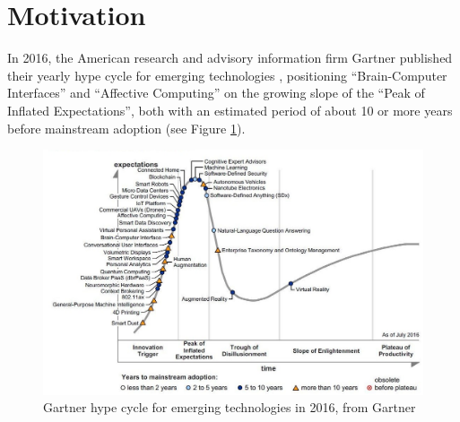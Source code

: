\section{Motivation}
\label{sec:motivation}
In 2016, the American research and advisory information firm Gartner published their yearly hype cycle for emerging 
technologies , positioning “Brain-Computer Interfaces” and “Affective Computing” on the growing slope of the “Peak of Inflated Expectations”, both with an estimated period of about 10 or more years before mainstream adoption (see Figure \ref{fig_hype_cycle}).
\begin{figure}[ht]
\includegraphics[width=\textwidth]{img/intro/hype_curve_trim.jpg}
\caption{Gartner hype cycle for emerging technologies in 2016, from Gartner\cite{noauthor_gartners_nodate}}\label{fig_hype_cycle}
\end{figure}
